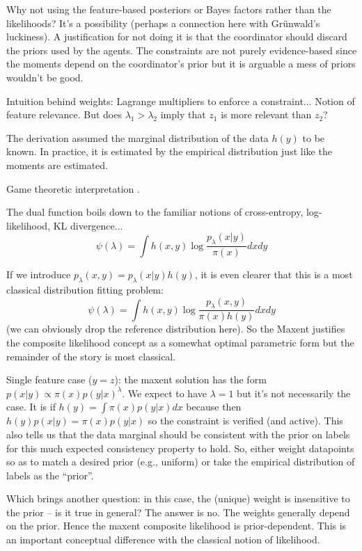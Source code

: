 \documentclass[english]{scrartcl}
\begin{document}

Why not using the feature-based posteriors or Bayes factors rather than the likelihoods? It's a possibility (perhaps a connection here with Gr\"unwald's luckiness). A justification for not doing it is that the coordinator should discard the priors used by the agents. The constraints are not purely evidence-based since the moments depend on the coordinator's prior but it is arguable a mess of priors wouldn't be good.

Intuition behind weights: Lagrange multipliers to enforce a constraint... Notion of feature relevance. But does $\lambda_1>\lambda_2$ imply that $z_1$ is more relevant than $z_2$? 

The derivation assumed the marginal distribution of the data $h(y)$ to be known. In practice, it is estimated by the empirical distribution just like the moments are estimated.

Game theoretic interpretation \cite{Grunwald-04}.

The dual function boils down to the familiar notions of cross-entropy, log-likelihood, KL divergence...
$$
\psi(\lambda)
= \int h(x,y) \log \frac{p_\lambda(x|y)}{\pi(x)} dx dy
$$

If we introduce $p_\lambda(x,y)=p_\lambda(x|y)h(y)$, it is even clearer that this is a most classical distribution fitting problem:
$$
\psi(\lambda)
= \int h(x,y) \log \frac{p_\lambda(x,y)}{\pi(x)h(y)} dx dy
$$
(we can obviously drop the reference distribution here). So the Maxent justifies the composite likelihood concept as a somewhat optimal parametric form but the remainder of the story is most classical.

Single feature case ($y=z$): the maxent solution has the form $p(x|y)\propto\pi(x)p(y|x)^\lambda$. We expect to have $\lambda=1$ but it's not necessarily the case. It is if $h(y)=\int\pi(x)p(y|x)dx$ because then $h(y)p(x|y)=\pi(x)p(y|x)$ so the constraint is verified (and active). This also tells us that the data marginal should be consistent with the prior on labels for this much expected consistency property to hold. So, either weight datapoints so as to match a desired prior (e.g., uniform) or take the empirical distribution of labels as the ``prior''. 

Which brings another question: in this case, the (unique) weight is insensitive to the prior -- is it true in general? The answer is no. The weights generally depend on the prior. Hence the maxent composite likelihood is prior-dependent. This is an important conceptual difference with the classical notion of likelihood.
\end{document}
